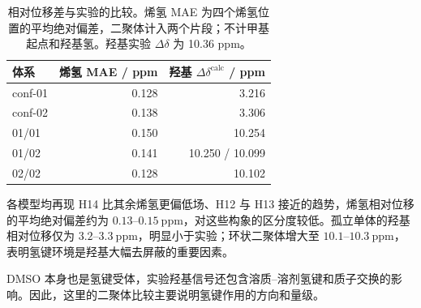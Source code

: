 \documentclass[a4paper,12pt]{article}
\begin{document}
\begin{table}[H]
\centering\small
\caption{相对位移差与实验的比较。烯氢 MAE 为四个烯氢位置的平均绝对偏差，二聚体计入两个片段；不计甲基起点和羟基氢。羟基实验 $\Delta\delta$ 为 10.36 ppm。}
\begin{tabular}{lrr}
\toprule
体系 & 烯氢 MAE / ppm & 羟基 $\Delta\delta^{\mathrm{calc}}$ / ppm\\
\midrule
conf-01 & 0.128 & 3.216\\
conf-02 & 0.138 & 3.306\\
01/01 & 0.150 & 10.254\\
01/02 & 0.141 & 10.250 / 10.099\\
02/02 & 0.128 & 10.102\\
\bottomrule
\end{tabular}
\end{table}
各模型均再现 H14 比其余烯氢更偏低场、H12 与 H13 接近的趋势，烯氢相对位移的平均绝对偏差约为 $0.13$--$0.15\ \mathrm{ppm}$，对这些构象的区分度较低。孤立单体的羟基相对位移仅为 $3.2$--$3.3\ \mathrm{ppm}$，明显小于实验；环状二聚体增大至 $10.1$--$10.3\ \mathrm{ppm}$，表明氢键环境是羟基大幅去屏蔽的重要因素。

DMSO 本身也是氢键受体，实验羟基信号还包含溶质--溶剂氢键和质子交换的影响。因此，这里的二聚体比较主要说明氢键作用的方向和量级。
\end{document}
